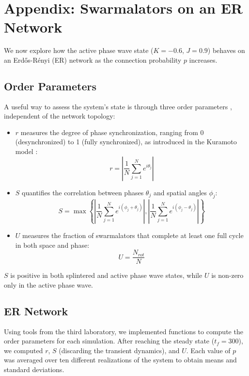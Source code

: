 \chapter{Appendix: Swarmalators on an ER Network}
We now explore how the active phase wave state ($K = -0.6$, $J = 0.9$) behaves on an Erdős-Rényi (ER) network as the connection probability $p$ increases.

\section{Order Parameters}
A useful way to assess the system's state is through three order parameters \cite{O_Keeffe_2017}, independent of the network topology:
\begin{itemize}
    \item \( r \) measures the degree of phase synchronization, ranging from 0 (desynchronized) to 1 (fully synchronized), as introduced in the Kuramoto model \cite{Acebron_2005}:
    \begin{equation}
        r = \left| \frac{1}{N} \sum_{j=1}^{N} e^{i \theta_j} \right|
        \label{equation::r}
    \end{equation}
    \item \( S \) quantifies the correlation between phases \( \theta_j \) and spatial angles \( \phi_j \):
    \begin{equation}
        S = \max \left\{  \left| \frac{1}{N} \sum_{j=1}^{N} e^{i (\phi_j+\theta_j)} \right|, \left| \frac{1}{N} \sum_{j=1}^{N} e^{i (\phi_j-\theta_j)} \right| \right\}
        \label{equation::S}
    \end{equation}
    \item \( U \) measures the fraction of swarmalators that complete at least one full cycle in both space and phase:
    \begin{equation}
        U = \frac{N_{rot}}{N}
        \label{equation::U}
    \end{equation}
\end{itemize}
\( S \) is positive in both splintered and active phase wave states, while \( U \) is non-zero only in the active phase wave.

\newpage
\section{ER Network}
Using tools from the third laboratory, we implemented functions to compute the order parameters for each simulation. After reaching the steady state ($t_f = 300$), we computed \( r \), \( S \) (discarding the transient dynamics), and \( U \). Each value of $p$ was averaged over ten different realizations of the system to obtain means and standard deviations.

